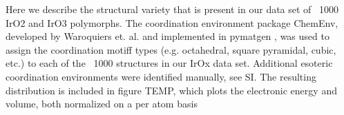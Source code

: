 

Here we describe the structural variety that is present in our data set of ~1000 IrO2 and IrO3 polymorphs.
The coordination environment package ChemEnv,
developed by Waroquiers et. al. \cite{Waroquiers2017} and implemented in pymatgen \cite{Ong2013},
was used to assign the coordination motiff types (e.g. octahedral, square pyramidal, cubic, etc.) to each of the ~1000 structures in our IrOx data set.
%
Additional esoteric coordination environments were identified manually, see SI.
The resulting distribution is included in figure TEMP, which plots the electronic energy and volume, both normalized on a per atom basis


